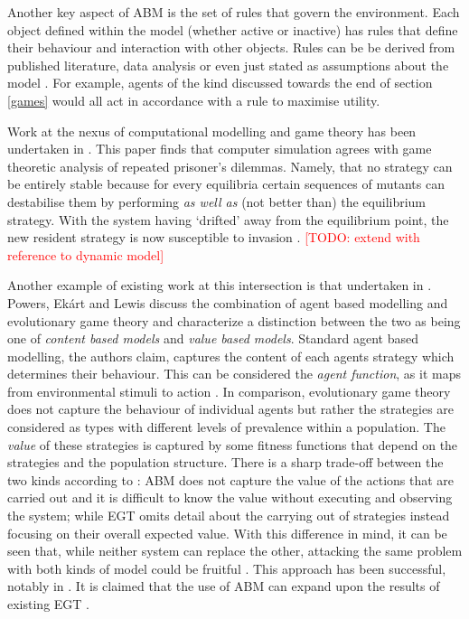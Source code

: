 \documentclass[11pt]{article}
\newcommand{\todo}[1]{\textcolor{red}{[TODO: #1]}\PackageWarning{TODO:}{#1!}}
\newcommand*{\np}{\par\noindent\newline}
\begin{document}
\np Another key aspect of ABM is the set of rules that govern the environment. Each object defined within the model
(whether active or inactive) has rules that define their behaviour and interaction with other objects. Rules can be be
derived from published literature, data analysis or even just stated as assumptions about the model
\citep{heppenstall_introduction_2012}. For example, agents of the kind discussed towards the end of section \ref{games}
would all act in accordance with a rule to maximise utility. 

\np Work at the nexus of computational modelling and game theory has been undertaken in \citet{garcia_no_2018}. This
paper finds that computer simulation agrees with game theoretic analysis of repeated prisoner's dilemmas. Namely, that
no strategy can be entirely stable because for every equilibria certain sequences of mutants can destabilise them by
performing \textit{as well as} (not better than) the equilibrium strategy. With the system having `drifted' away from
the equilibrium point, the new resident strategy is now susceptible to invasion \citep{garcia_no_2018}. \todo{ extend
with reference to dynamic model}

\np Another example of existing work at this intersection is that undertaken in \citet{powers_modelling_2018}. Powers,
Ekárt and Lewis discuss the combination of agent based modelling and evolutionary game theory and characterize a
distinction between the two as being one of \textit{content based models} and \textit{value based models}. Standard
agent based modelling, the authors claim, captures the content of each agents strategy which determines their behaviour.
This can be considered the \textit{agent function}, as it maps from environmental stimuli to action \citep[~p.
69]{powers_modelling_2018}. In comparison, evolutionary game theory does not capture the behaviour of individual agents
but rather the strategies are considered as types with different levels of prevalence within a population. The
\textit{value} of these strategies is captured by some fitness functions that depend on the strategies and the
population structure. There is a sharp trade-off between the two kinds according to \citet{powers_modelling_2018}: ABM
does not capture the value of the actions that are carried out and it is difficult to know the value without executing
and observing the system; while EGT omits detail about the carrying out of strategies instead focusing on their overall
expected value. With this difference in mind, it can be seen that, while neither system can replace the other, attacking
the same problem with both kinds of model could be fruitful \citep{powers_modelling_2018}. This approach has
been successful, notably in \citep{axelrod_effective_1980}. It is claimed that the use of ABM can expand upon the results of existing EGT \citep[~p.71]{powers_modelling_2018}.
\end{document}
